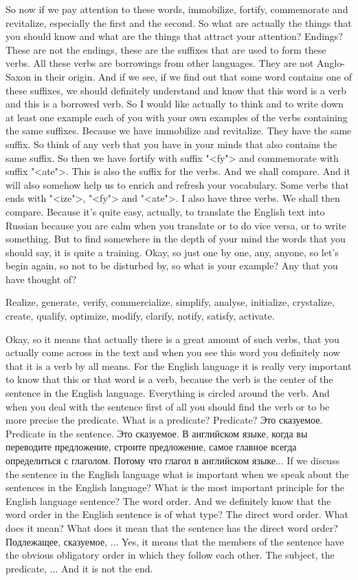 \documentclass[main.tex]{subfiles}
\begin{document}
So now if we pay attention to these words, immobilize, fortify, commemorate and revitalize, especially the first and the second.
So what are actually the things that you should know and what are the things that attract your attention?
Endings?
These are not the endings, these are the suffixes that are used to form these verbs.
All these verbs are borrowings from other languages.
They are not Anglo-Saxon in their origin.
And if we see, if we find out that some word contains one of these suffixes, we should definitely understand and know that this word is a verb and this is a borrowed verb.
So I would like actually to think and to write down at least one example each of you with your own examples of the verbs containing the same suffixes.
Because we have immobilize and revitalize.
They have the same suffix.
So think of any verb that you have in your minds that also contains the same suffix.
So then we have fortify with suffix "<fy"> and commemorate with suffix "<ate">.
This is also the suffix for the verbs.
And we shall compare.
And it will also somehow help us to enrich and refresh your vocabulary.
Some verbs that ends with "<ize">, "<fy"> and "<ate">.
I also have three verbs.
We shall then compare.
Because it's quite easy, actually, to translate the English text into Russian because you are calm when you translate or to do vice versa, or to write something.
But to find somewhere in the depth of your mind the words that you should say, it is quite a training.
Okay, so just one by one, any, anyone, so let's begin again, so not to be disturbed by, so what is your example? Any that you have thought of?

Realize, generate, verify, commercialize, simplify, analyse, initialize, crystalize, create, qualify, optimize, modify, clarify, notify, satisfy, activate.

Okay, so it means that actually there is a great amount of such verbs, that you actually come across in the text and when you see this word you definitely now that it is a verb by all means.
For the English language it is really very important to know that this or that word is a verb, because the verb is the center of the sentence in the English language.
Everything is circled around the verb.
And when you deal with the sentence first of all you should find the verb or to be more precise the predicate.
What is a predicate? Predicate?
Это сказуемое.
Predicate in the sentence.
Это сказуемое.
В английском языке, когда вы переводите предложение, строите предложение, самое главное всегда определиться с глаголом.
Потому что глагол в английском языке...
If we discuss the sentence in the English language what is important when we speak about the sentences in the English language?
What is the most important principle for the English language sentence?
The word order.
And we definitely know that the word order in the English sentence is of what type?
The direct word order.
What does it mean?
What does it mean that the sentence has the direct word order?
Подлежащее, сказуемое, ...
Yes, it means that the members of the sentence have the obvious obligatory order in which they follow each other.
The subject, the predicate, ... And it is not the end.
\end{document}
